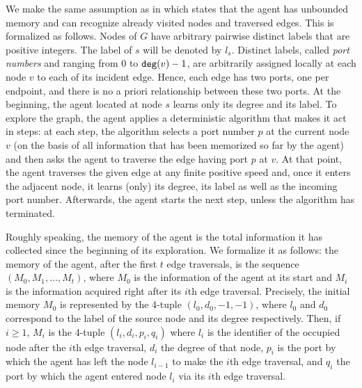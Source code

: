 \documentclass[11pt]{article}
\begin{document}
We make the same assumption as in \cite{DuncanKK06} which
states that the agent has unbounded memory and can recognize already
visited nodes and traversed edges.
This is formalized as follows. Nodes of $G$ have arbitrary pairwise
distinct labels that are positive integers. The label of $s$ will be denoted by $l_s$. Distinct labels, called
{\em port numbers} and ranging from $0$ to ${\tt deg}(v)-1$, are
arbitrarily assigned locally at each node $v$ to each of its incident
edge. Hence, each edge has two ports, one per endpoint, and there
is no a priori relationship between these two ports. At the beginning, the
agent located at node $s$
learns only its degree and its label. To explore the graph, the
agent applies a deterministic algorithm that makes it act in steps: at each step,
the algorithm selects a port number $p$ at the current node $v$ (on
the basis of all information that has been memorized so far by the
agent) and then asks the agent to traverse the edge having port $p$ at
$v$. At that point, the agent traverses the given edge at any finite positive speed and, once it enters the adjacent node, it learns (only) its
degree, its label as well as the incoming port number. Afterwards, the agent starts
the next step, unless the algorithm has terminated.

Roughly speaking, the memory of the agent is the total information it has collected since the beginning
of its exploration. We formalize it as follows: the
memory of the agent, after the first $t$ edge traversals, is the
sequence $(M_0,M_1,\dots ,M_t)$, where $M_0$ is the information of the
agent at its start and $M_i$ is the information acquired right after
its $i$th edge traversal. Precisely, the initial memory $M_0$ is
represented by the 4-tuple $(l_0,d_0,-1,-1)$, where $l_0$ and $d_0$
correspond to the label of the source node and its degree
respectively.  Then, if $i\geq 1$, $M_i$ is the 4-tuple
$(l_{i},d_i,p_i,q_i)$ where $l_i$ is the identifier of the occupied
node after the $i$th edge traversal, $d_i$ the degree of that node,
$p_i$ is the port by which the agent has left the node $l_{i-1}$ to
make the $i$th edge traversal, and $q_i$ the port by which the agent
entered node $l_i$ via its $i$th edge traversal.

\end{document}
